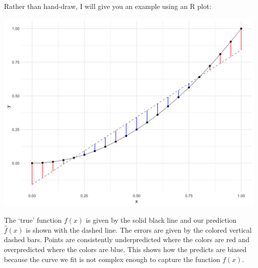 \documentclass[12pt,hidelinks]{article}
\numberwithin{equation}{section}
\begin{document}
\vspace*{12pt}

Rather than hand-draw, I will give you an example using an R plot:




\begin{center}
\includegraphics[width=\textwidth]{figures/sol01-fig01}
\end{center}

The `true' function $f(x)$ is given by the solid black line and our prediction
$\widehat{f}(x)$ is shown with the dashed line. The errors are given by the
colored vertical dashed bars. Points are consistently underpredicted where
the colors are red and overpredicted where the colors are blue. This shows
how the predicts are biased because the curve we fit is not complex enough to
capture the function $f(x)$.

\vspace*{12pt}
\end{document}
